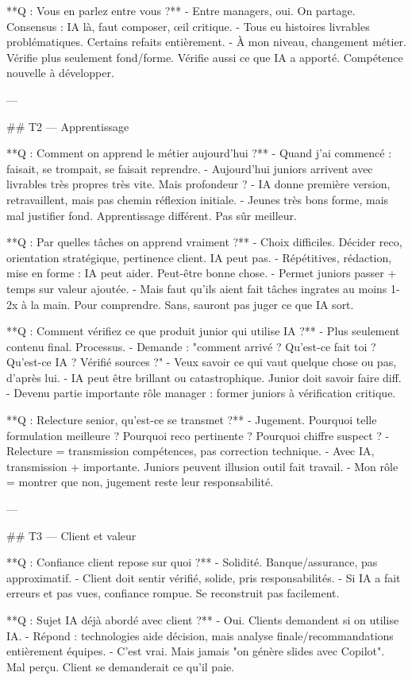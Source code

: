 **Q : Vous en parlez entre vous ?**
- Entre managers, oui. On partage. Consensus : IA là, faut composer, œil critique.
- Tous eu histoires livrables problématiques. Certains refaits entièrement.
- À mon niveau, changement métier. Vérifie plus seulement fond/forme. Vérifie aussi ce que IA a apporté. Compétence nouvelle à développer.

---

## T2 — Apprentissage

**Q : Comment on apprend le métier aujourd'hui ?**
- Quand j'ai commencé : faisait, se trompait, se faisait reprendre.
- Aujourd'hui juniors arrivent avec livrables très propres très vite. Mais profondeur ?
- IA donne première version, retravaillent, mais pas chemin réflexion initiale.
- Jeunes très bons forme, mais mal justifier fond. Apprentissage différent. Pas sûr meilleur.

**Q : Par quelles tâches on apprend vraiment ?**
- Choix difficiles. Décider reco, orientation stratégique, pertinence client. IA peut pas.
- Répétitives, rédaction, mise en forme : IA peut aider. Peut-être bonne chose.
- Permet juniors passer + temps sur valeur ajoutée.
- Mais faut qu'ils aient fait tâches ingrates au moins 1-2x à la main. Pour comprendre. Sans, sauront pas juger ce que IA sort.

**Q : Comment vérifiez ce que produit junior qui utilise IA ?**
- Plus seulement contenu final. Processus.
- Demande : "comment arrivé ? Qu'est-ce fait toi ? Qu'est-ce IA ? Vérifié sources ?"
- Veux savoir ce qui vaut quelque chose ou pas, d'après lui.
- IA peut être brillant ou catastrophique. Junior doit savoir faire diff.
- Devenu partie importante rôle manager : former juniors à vérification critique.

**Q : Relecture senior, qu'est-ce se transmet ?**
- Jugement. Pourquoi telle formulation meilleure ? Pourquoi reco pertinente ? Pourquoi chiffre suspect ?
- Relecture = transmission compétences, pas correction technique.
- Avec IA, transmission + importante. Juniors peuvent illusion outil fait travail.
- Mon rôle = montrer que non, jugement reste leur responsabilité.

---

## T3 — Client et valeur

**Q : Confiance client repose sur quoi ?**
- Solidité. Banque/assurance, pas approximatif.
- Client doit sentir vérifié, solide, pris responsabilités.
- Si IA a fait erreurs et pas vues, confiance rompue. Se reconstruit pas facilement.

**Q : Sujet IA déjà abordé avec client ?**
- Oui. Clients demandent si on utilise IA.
- Répond : technologies aide décision, mais analyse finale/recommandations entièrement équipes.
- C'est vrai. Mais jamais "on génère slides avec Copilot". Mal perçu. Client se demanderait ce qu'il paie.

